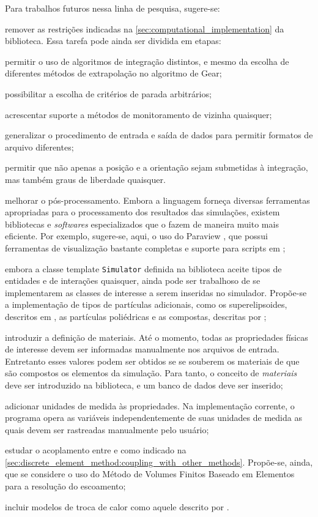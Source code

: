 Para trabalhos futuros nessa linha de pesquisa, sugere-se:
\begin{alineas}
\item remover as restrições indicadas na \cref{sec:computational_implementation} da biblioteca. Essa tarefa pode ainda ser dividida em etapas:
	\begin{alineas}
	\item permitir o uso de algoritmos de integração distintos, e mesmo da escolha de diferentes métodos de extrapolação no algoritmo de Gear;
	\item possibilitar a escolha de critérios de parada arbitrários;
	\item acrescentar suporte a métodos de monitoramento de vizinha quaisquer;
	\item generalizar o procedimento de entrada e saída de dados para permitir formatos de arquivo diferentes;
	\item permitir que não apenas a posição e a orientação sejam submetidas à integração, mas também graus de liberdade quaisquer.
	\end{alineas}
\item melhorar o pós-processamento. Embora a linguagem \Python{} forneça diversas ferramentas apropriadas para o processamento dos resultados das simulações, existem bibliotecas e \textit{softwares} especializados que o fazem de maneira muito mais eficiente. Por exemplo, sugere-se, aqui, o uso do Paraview \cite{bib:paraview_book,bib:paraview_handbook}, que possui ferramentas de visualização bastante completas e suporte para scripts em \Python{};
\item embora a classe template \lstinline[style=Inline C++]{Simulator} definida na biblioteca aceite tipos de entidades e de interações quaisquer, ainda pode ser trabalhoso de se implementarem as classes de interesse a serem inseridas no simulador. Propõe-se a implementação de tipos de partículas adicionais, como os superelipsoides, descritos em , as partículas poliédricas e as compostas, descritas por ;
\item introduzir a definição de materiais. Até o momento, todas as propriedades físicas de interesse devem ser informadas manualmente nos arquivos de entrada. Entretanto esses valores podem ser obtidos se se souberem os materiais de que são compostos os elementos da simulação. Para tanto, o conceito de \textit{materiais} deve ser introduzido na biblioteca, e um banco de dados deve ser inserido;
\item adicionar unidades de medida às propriedades. Na implementação corrente, o programa opera as variáveis independentemente de suas unidades de medida as quais devem ser rastreadas manualmente pelo usuário;
\item estudar o acoplamento entre \DEM{} e \CFD{} como indicado na \cref{sec:discrete_element_method:coupling_with_other_methods}. Propõe-se, ainda, que se considere o uso do Método de Volumes Finitos Baseado em Elementos para a resolução do escoamento;
\item incluir modelos de troca de calor como aquele descrito por .
\end{alineas}

